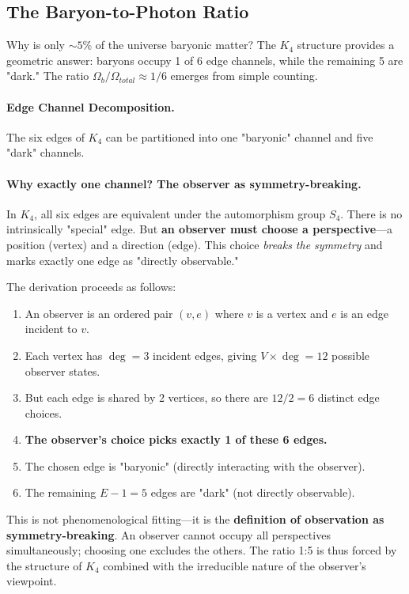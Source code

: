 \documentclass[11pt,a4paper]{book}
\def\text#1{#1}%
\begin{document}
\subsection{The Baryon-to-Photon Ratio}

Why is only $\sim 5\%$ of the universe baryonic matter? The $K_4$ structure provides a 
geometric answer: baryons occupy 1 of 6 edge channels, while the remaining 5 are "dark." 
The ratio $\Omega_b/\Omega_{\text{total}} \approx 1/6$ emerges from simple counting.

\paragraph{Edge Channel Decomposition.}
The six edges of $K_4$ can be partitioned into one "baryonic" channel and five "dark" 
channels. 

\paragraph{Why exactly one channel? The observer as symmetry-breaking.}

In $K_4$, all six edges are equivalent under the automorphism group $S_4$. There is no 
intrinsically "special" edge. But \textbf{an observer must choose a perspective}—a 
position (vertex) and a direction (edge). This choice \emph{breaks the symmetry} and 
marks exactly one edge as "directly observable."

The derivation proceeds as follows:
\begin{enumerate}
\item An observer is an ordered pair $(v, e)$ where $v$ is a vertex and $e$ is an edge 
      incident to $v$.
\item Each vertex has $\deg = 3$ incident edges, giving $V \times \deg = 12$ possible 
      observer states.
\item But each edge is shared by 2 vertices, so there are $12/2 = 6$ distinct edge choices.
\item \textbf{The observer's choice picks exactly 1 of these 6 edges.}
\item The chosen edge is "baryonic" (directly interacting with the observer).
\item The remaining $E - 1 = 5$ edges are "dark" (not directly observable).
\end{enumerate}

This is not phenomenological fitting—it is the \textbf{definition of observation as 
symmetry-breaking}. An observer cannot occupy all perspectives simultaneously; choosing 
one excludes the others. The ratio 1:5 is thus forced by the structure of $K_4$ combined 
with the irreducible nature of the observer's viewpoint.
\end{document}
